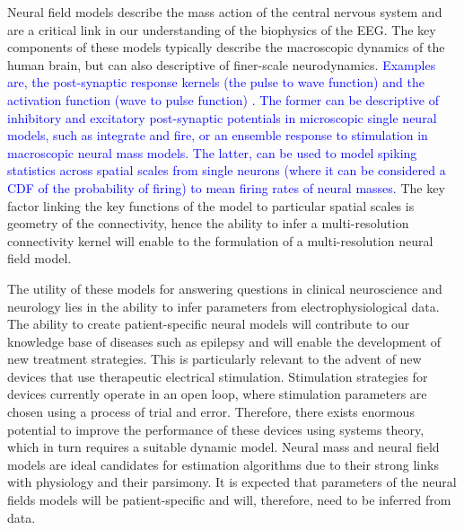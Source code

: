 \documentclass[review,authoryear,3p]{elsarticle}
\newcommand{\parham}[1]{\textcolor{blue}{#1}}
\begin{document}
Neural field models describe the mass action of the central nervous system and are a critical link in our understanding of the biophysics of the EEG. The key components of these models typically describe the macroscopic dynamics of the human brain, but can also descriptive of finer-scale neurodynamics. \parham{Examples are, the post-synaptic response kernels (the pulse to wave function) and the activation function (wave to pulse function) \citep{Jirsa1997}. The former can be descriptive of inhibitory and excitatory post-synaptic potentials in microscopic single neural models, such as integrate and fire, or an ensemble response to stimulation in macroscopic neural mass models. The latter,  can be used to model spiking statistics across spatial scales from single neurons (where it can be considered a CDF of the probability of firing) to mean firing rates of neural masses.} The key factor linking the key functions of the model to particular spatial scales is geometry of the connectivity, hence the ability to infer a multi-resolution connectivity kernel will enable to the formulation of a multi-resolution neural field model. 

The utility of these models for answering questions in clinical neuroscience and neurology lies in the ability to infer parameters from electrophysiological data. The ability to create patient-specific neural models will contribute to our knowledge base of diseases such as epilepsy and will enable the development of new treatment strategies. This is particularly relevant to the advent of new devices that use therapeutic electrical stimulation. Stimulation strategies for devices currently operate in an open loop, where stimulation parameters are chosen using a process of trial and error. Therefore, there exists enormous potential to improve the performance of these devices using systems theory, which in turn requires a suitable dynamic model. Neural mass and neural field models are ideal candidates for estimation algorithms due to their strong links with physiology and their parsimony. It is expected that parameters of the neural fields models will be patient-specific and will, therefore, need to be inferred from data.
\end{document}
